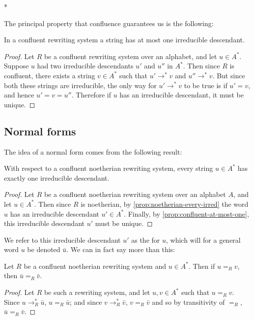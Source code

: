\documentclass[noindex,noinsetproof,emphthm,12pt]{lmaths}
\begin{document}
\medskip
\begin{center}*\end{center}

The principal property that confluence guarantees us is the following:

\begin{prop}
	In a confluent rewriting system a string has at most one irreducible descendant. \label{prop:confluent-at-most-one}
\end{prop}
\begin{proof}
	Let $R$ be a confluent rewriting system over an alphabet, and let $u \in A^*$. Suppose $u$ had two irreducible descendants $u'$ and $u''$ in $A^*$. Then since $R$ is confluent, there exists a string $v \in A^*$ such that $u' \to^* v$ and $u'' \to^* v$. But since both these strings are irreducible, the only way for $u' \to^* v$ to be true is if $u' = v$, and hence $u' = v = u''$. Therefore if $u$ has an irreducible descendant, it must be unique.
\end{proof}

\subsection{Normal forms} \label{sec:normal-forms}

The idea of a normal form comes from the following result:

\begin{prop}
	With respect to a confluent noetherian rewriting system, every string $u \in A^*$ has exactly one irreducible descendant.
\end{prop}
\begin{proof}
	Let $R$ be a confluent noetherian rewriting system over an alphabet $A$, and let $u \in A^*$. Then since $R$ is noetherian, by \cref{prop:noetherian-every-irred} the word $u$ has an irreducible descendant $u' \in A^*$. Finally, by \cref{prop:confluent-at-most-one}, this irreducible descendant $u'$ must be unique.
\end{proof}

We refer to this irreducible descendant $u'$ as the  for $u$, which will for a general word $u$ be denoted $\bar u$. We can in fact say more than this:

\begin{theorem}
	Let $R$ be a confluent noetherian rewriting system and $u \in A^*$. Then if $u =_R v$, then $\bar u =_R \bar v$.
\end{theorem}
\begin{proof}
	Let $R$ be such a rewriting system, and let $u, v \in A^*$ such that $u =_R v$. Since $u \to_R^* \bar u$, $u =_R \bar u$; and since $v \to_R^* \bar v$, $v =_R \bar v$ and so by transitivity of $=_R$, $\bar u =_R \bar v$.
\end{proof}
\end{document}
